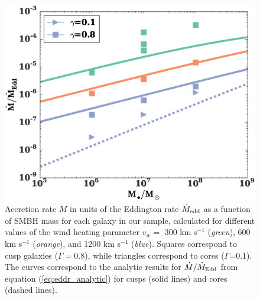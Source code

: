 \documentclass[usenatbib,fleqn]{mn2e}
\newcommand{\eddr}{\dot{M}/\dot{M}_{\rm Edd}}
\newcommand{\Mbh}[1][]{M_{\bullet#1}}
\newcommand{\vwO}{v_{w}}
\begin{document}

\begin{figure}
  \includegraphics[width=\columnwidth]{mdot_mass.eps}
  \caption{\label{fig:mdot_mass} Accretion rate $\dot{M}$ in units of
    the Eddington rate $\dot{M}_{\rm edd}$ as a function of SMBH mass
    for each galaxy in our sample, calculated for different values of
    the wind heating parameter $\vwO =$ 300 km s$^{-1}$ ({\it green}),
    600 km s$^{-1}$ ({\it orange}), and 1200 km s$^{-1}$ ({\it blue}).
    Squares correspond to cusp galaxies ($\Gamma=0.8$), while
    triangles correspond to cores ($\Gamma$=0.1). The curves correspond
    to the analytic results for $\eddr$ from equation
    (\ref{eq:eddr_analytic}) for cusps (solid lines) and cores (dashed
    lines).  }
\end{figure}
\end{document}
